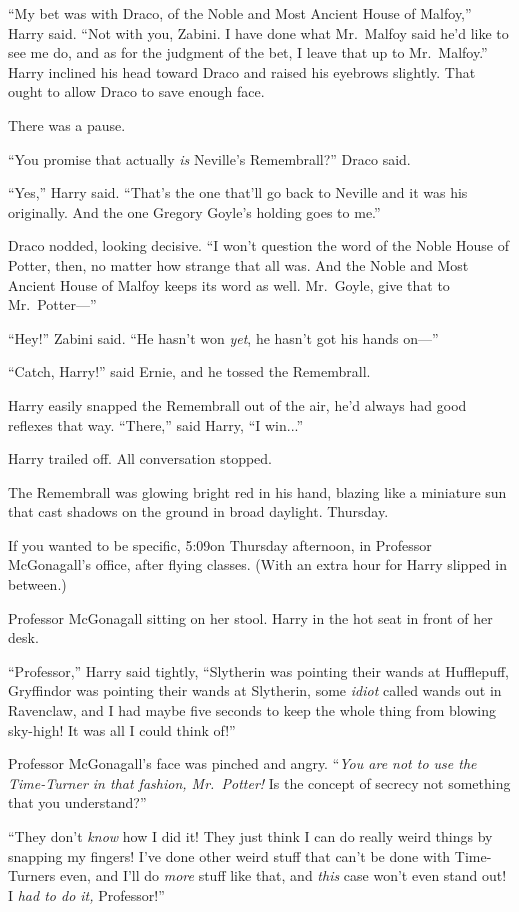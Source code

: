“My bet was with Draco, of the Noble and Most Ancient House of Malfoy,” Harry said. “Not with you, Zabini. I have done what Mr.~Malfoy said he’d like to see me do, and as for the judgment of the bet, I leave that up to Mr.~Malfoy.” Harry inclined his head toward Draco and raised his eyebrows slightly. That ought to allow Draco to save enough face.

There was a pause.

“You promise that actually \emph{is} Neville’s Remembrall?” Draco said.

“Yes,” Harry said. “That’s the one that’ll go back to Neville and it was his originally. And the one Gregory Goyle’s holding goes to me.”

Draco nodded, looking decisive. “I won’t question the word of the Noble House of Potter, then, no matter how strange that all was. And the Noble and Most Ancient House of Malfoy keeps its word as well. Mr.~Goyle, give that to Mr.~Potter—”

“Hey!” Zabini said. “He hasn’t won \emph{yet}, he hasn’t got his hands on—”

“Catch, Harry!” said Ernie, and he tossed the Remembrall.

Harry easily snapped the Remembrall out of the air, he’d always had good reflexes that way. “There,” said Harry, “I win...”

Harry trailed off. All conversation stopped.

The Remembrall was glowing bright red in his hand, blazing like a miniature sun that cast shadows on the ground in broad daylight.
\sbreak
Thursday.

If you wanted to be specific, 5:09\PM on Thursday afternoon, in Professor McGonagall’s office, after flying classes. (With an extra hour for Harry slipped in between.)

Professor McGonagall sitting on her stool. Harry in the hot seat in front of her desk.

“Professor,” Harry said tightly, “Slytherin was pointing their wands at Hufflepuff, Gryffindor was pointing their wands at Slytherin, some \emph{idiot} called wands out in Ravenclaw, and I had maybe five seconds to keep the whole thing from blowing sky-high! It was all I could think of!”

Professor McGonagall’s face was pinched and angry. “\emph{You are not to use the Time-Turner in that fashion, Mr.~Potter!} Is the concept of secrecy not something that you understand?”

“They don’t \emph{know} how I did it! They just think I can do really weird things by snapping my fingers! I’ve done other weird stuff that can’t be done with Time-Turners even, and I’ll do \emph{more} stuff like that, and \emph{this} case won’t even stand out! I \emph{had to do it,} Professor!”


